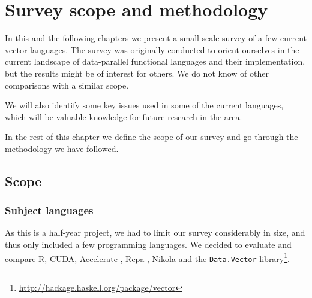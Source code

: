 \chapter{Survey scope and methodology}

%
%
%

In this and the following chapters we present a small-scale survey of
a few current vector languages. The survey was originally conducted to
orient ourselves in the current landscape of data-parallel functional
languages and their implementation, but the results might be of
interest for others. We do not know of other comparisons with a
similar scope.

We will also identify some key issues used in some of the current
languages, which will be valuable knowledge for future research in the
area.

In the rest of this chapter we define the scope of our survey and go
through the methodology we have followed.

\section{Scope}
\subsection{Subject languages}
%
%
%
%
%
%
As this is a half-year project, we had to limit our survey
considerably in size, and thus only included a few programming
languages. We decided to evaluate and compare R, CUDA, Accelerate
\cite{chakravarty2011accelerating}, Repa \cite{keller2010regular},
Nikola \cite{mainland2010nikola} and the \texttt{Data.Vector}
library\footnote{\url{http://hackage.haskell.org/package/vector}}. 

